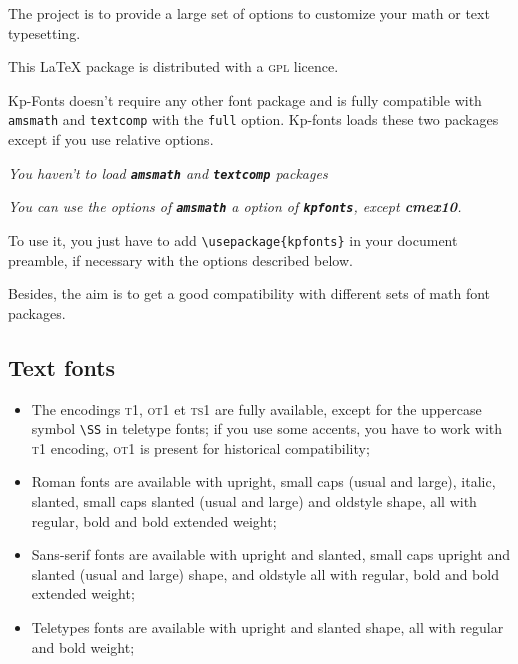 \documentclass[a4paper,11pt]{christophe}
\begin{document}
\bigskip

The project is to provide a large set of options to customize your math or text typesetting.

\medskip

This LaTeX package is distributed with a \textsc{gpl} licence.

\medskip

Kp-Fonts doesn't require any other font package and is fully compatible with \texttt{amsmath} and \texttt{textcomp}
with the \texttt{full} option. Kp-fonts loads these two packages except if you use relative options.
 
\begin{center}
\textit{You haven't to load \textbf{\texttt{amsmath}} and \textbf{\texttt{textcomp}} packages}
\end{center}

\begin{center}\itshape
You can use the options of \textbf{\texttt{amsmath}} a option of \textbf{\texttt{kpfonts}}, except \textbf{cmex10}.
\end{center}

To use it, you just have to add \verb+\usepackage{kpfonts}+ in your document preamble, if necessary with the options described below.

Besides, the aim is to get a good compatibility with different sets of math font packages.

\subsection{Text fonts}

\begin{itemize}
  \item The encodings \textsc{t1, ot1} et \textsc {ts1} are fully available, except for the uppercase symbol \verb+\SS+ in teletype fonts; if you use some accents, you have to work with \textsc{t1} encoding, \textsc{ot1} is present for historical compatibility;
  \item Roman fonts are available with upright, small caps (usual and large), italic, slanted, small caps slanted (usual and large) and oldstyle shape, all with regular, bold and bold extended weight;
  \item Sans-serif fonts are available with upright and slanted, small caps upright and slanted (usual and large) shape, and oldstyle all with regular, bold and bold extended weight;
  \item Teletypes fonts are available with upright and slanted shape, all with regular and bold weight;
\end{itemize}
\end{document}
